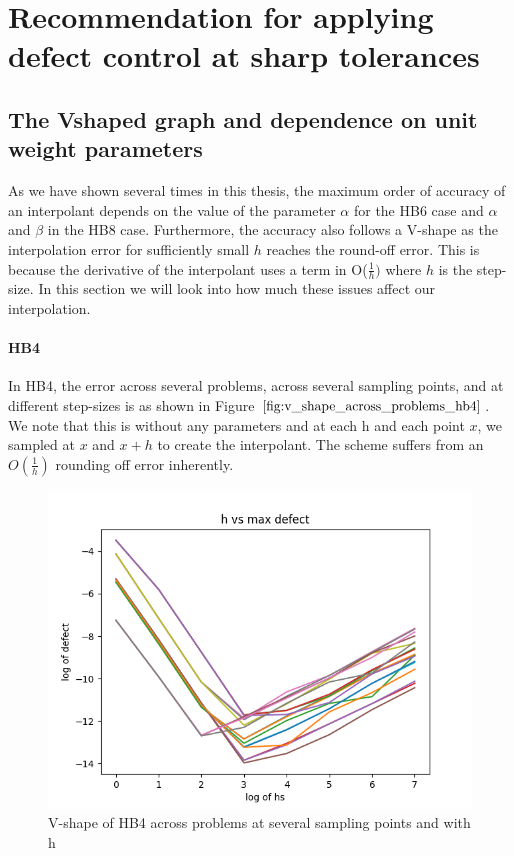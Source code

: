 \section{Recommendation for applying defect control at sharp tolerances}
\label{section:HBs_higher_tol}
\subsection{The Vshaped graph and dependence on unit weight parameters}
\label{section:v_shaped_graph}
As we have shown several times in this thesis, the maximum order of accuracy of an interpolant depends on the value of the parameter $\alpha$ for the HB6 case and $\alpha$ and $\beta$ in the HB8 case. Furthermore, the accuracy also follows a V-shape as the interpolation error for sufficiently small $h$ reaches the round-off error. This is because the derivative of the interpolant uses a term in O($\frac{1}{h})$ where $h$ is the step-size. In this section we will look into how much these issues affect our interpolation. 

\paragraph{HB4}
In HB4, the error across several problems, across several sampling points, and at different step-sizes is as shown in Figure $\ref{fig:v_shape_across_problems_hb4}$. We note that this is without any parameters and at each h and each point $x$, we sampled at $x$ and $x + h$ to create the interpolant. The scheme suffers from an $O(\frac{1}{h})$ rounding off error inherently.
\begin{figure}[H]
\centering
\includegraphics[width=0.7\linewidth]{./figures/v_shape_across_problems_hb4}
\caption{V-shape of HB4 across problems at several sampling points and with h}
\label{fig:v_shape_across_problems_hb4}
\end{figure}

